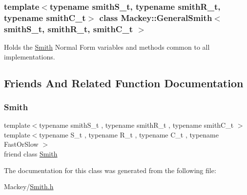 \subsubsection*{template$<$typename smith\+S\+\_\+t, typename smith\+R\+\_\+t, typename smith\+C\+\_\+t$>$\newline
class Mackey\+::\+General\+Smith$<$ smith\+S\+\_\+t, smith\+R\+\_\+t, smith\+C\+\_\+t $>$}

Holds the \hyperlink{classMackey_1_1Smith}{Smith} Normal Form variables and methods common to all implementations. 

\subsection{Friends And Related Function Documentation}
\mbox{\label{classMackey_1_1GeneralSmith_aa10f0f4c3408f3557b07883e86efc88a}} 
\subsubsection{\texorpdfstring{Smith}{Smith}}
{\footnotesize\ttfamily template$<$typename smith\+S\+\_\+t , typename smith\+R\+\_\+t , typename smith\+C\+\_\+t $>$ \\
template$<$typename S\+\_\+t , typename R\+\_\+t , typename C\+\_\+t , typename Fast\+Or\+Slow $>$ \\
friend class \hyperlink{classMackey_1_1Smith}{Smith}\hspace{0.3cm}{\ttfamily [friend]}}



The documentation for this class was generated from the following file\+:\begin{DoxyCompactItemize}
\item 
Mackey/\hyperlink{Smith_8h}{Smith.\+h}\end{DoxyCompactItemize}
